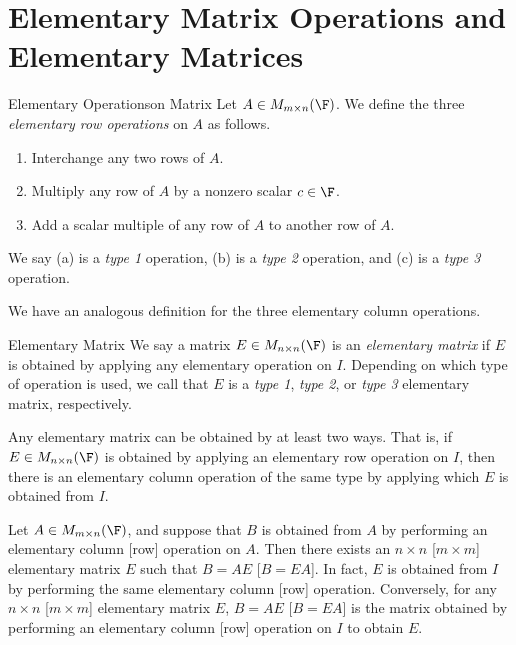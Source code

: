\documentclass[linearalgebraI]{subfiles}
\begin{document}

    \section{Elementary Matrix Operations and Elementary Matrices}

    \begin{definition}{Elementary Operations}{on Matrix}
        Let $A\in M_{m\times n}(\F)$. We define the three \emph{elementary row operations} on $A$ as follows.

        \begin{enumerate}
            \item Interchange any two rows of $A$.
            \item Multiply any row of $A$ by a nonzero scalar $c\in \F$.
            \item Add a scalar multiple of any row of $A$ to another row of $A$.
        \end{enumerate}
        We say (a) is a \emph{type 1} operation, (b) is a \emph{type 2} operation, and (c) is a \emph{type 3} operation.
    \end{definition}

    \begin{remark}
        We have an analogous definition for the three elementary column operations.
    \end{remark}

    \begin{definition}{Elementary Matrix}{}
        We say a matrix $E\in M_{n\times n}(\F)$ is an \emph{elementary matrix} if $E$ is obtained by applying any elementary operation on $I$. Depending on which type of operation is used, we call that $E$ is a \emph{type 1}, \emph{type 2}, or \emph{type 3} elementary matrix, respectively.
    \end{definition}
    
    \begin{remark}
        Any elementary matrix can be obtained by at least two ways. That is, if $E\in M_{n\times n}(\F)$ is obtained by applying an elementary row operation on $I$, then there is an elementary column operation of the same type by applying which $E$ is obtained from $I$.
    \end{remark}

    \begin{theorem}{}
        Let $A\in M_{m\times n}(\F)$, and suppose that $B$ is obtained from $A$ by performing an elementary column [row] operation on $A$. Then there exists an $n\times n$ [$m\times m$] elementary matrix $E$ such that $B=AE$ [$B=EA$]. In fact, $E$ is obtained from $I$ by performing the same elementary column [row] operation. Conversely, for any $n\times n$ [$m\times m$] elementary matrix $E$, $B=AE$ [$B=EA$] is the matrix obtained by performing an elementary column [row]
        operation on $I$ to obtain $E$.
    \end{theorem}
\end{document}
